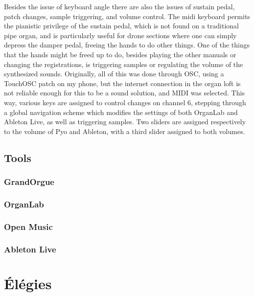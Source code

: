 \documentclass[12pt,twoside,maitrise]{dms_ks}
\theoremstyle{definition}
\begin{document}
Besides the issue of keyboard angle there are also the issues of sustain pedal, patch changes, sample triggering, and volume control. The midi keyboard permits the pianistic privilege of the sustain pedal, which is not found on a traditional pipe organ, and is particularly useful for drone sections where one can simply depress the damper pedal, freeing the hands to do other things. One of the things that the hands might be freed up to do, besides playing the other manuals or changing the registrations, is triggering samples or regulating the volume of the synthesized sounds. Originally, all of this was done through OSC, using a TouchOSC patch on my phone, but the internet connection in the organ loft is not reliable enough for this to be a sound solution, and MIDI was selected. This way, various keys are assigned to control changes on channel 6, stepping through a global navigation scheme which modifies the settings of both OrganLab and Ableton Live, as well as triggering samples. Two sliders are assigned respectively to the volume of Pyo and Ableton, with a third slider assigned to both volumes. 

\section{Tools}

\subsection{GrandOrgue}


\subsection{OrganLab}

\subsection{Open Music}

\subsection{Ableton Live}

\chapter{Élégies}

\end{document}
